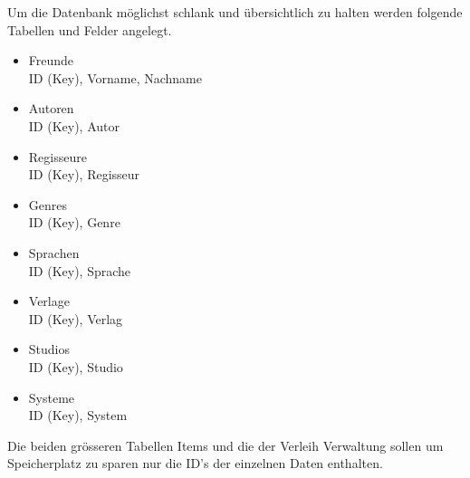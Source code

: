 Um die Datenbank möglichst schlank und übersichtlich zu halten werden folgende Tabellen und Felder angelegt.

\begin{itemize}
	\item Freunde \\
		ID (Key), Vorname, Nachname   
	\item Autoren \\
		ID (Key), Autor
	\item Regisseure \\
		ID (Key), Regisseur
	\item Genres \\
		ID (Key), Genre
	\item Sprachen \\
		ID (Key), Sprache
	\item Verlage \\
		ID (Key), Verlag
	\item Studios \\
		ID (Key), Studio
	\item Systeme \\
		ID (Key), System
\end{itemize}

Die beiden grösseren Tabellen Items und die der Verleih Verwaltung sollen um Speicherplatz zu sparen nur die ID's der einzelnen Daten enthalten.